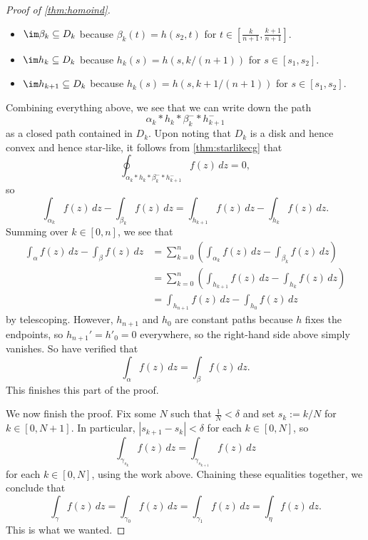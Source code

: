 \begin{proof}[Proof of \autoref{thm:homoind}]
\begin{itemize}
		\item $\im\beta_k\subseteq D_k$ because $\beta_k(t)=h(s_2,t)$ for $t\in\left[\frac k{n+1},\frac{k+1}{n+1}\right]$.
		\item $\im h_k\subseteq D_k$ because $h_k(s)=h(s,k/(n+1))$ for $s\in[s_1,s_2]$.
		\item $\im h_{k+1}\subseteq D_k$ because $h_k(s)=h(s,{k+1}/(n+1))$ for $s\in[s_1,s_2]$.
	\end{itemize}
	Combining everything above, we see that we can write down the path
	\[\alpha_k*h_k*\beta_k^-*h_{k+1}^-\]
	as a closed path contained in $D_k$. Upon noting that $D_k$ is a disk and hence convex and hence star-like, it follows from \autoref{thm:starlikecg} that
	\[\oint_{\alpha_k*h_k*\beta_k^-*h_{k+1}^-}f(z)\,dz=0,\]
	so
	\[\int_{\alpha_k}f(z)\,dz-\int_{\beta_k}f(z)\,dz=\int_{h_{k+1}}f(z)\,dz-\int_{h_k}f(z)\,dz.\]
	Summing over $k\in[0,n]$, we see that
	\begin{align*}
		\int_\alpha f(z)\,dz-\int_\beta f(z)\,dz &= \sum_{k=0}^n\left(\int_{\alpha_k}f(z)\,dz-\int_{\beta_k}f(z)\,dz\right) \\
		&= \sum_{k=0}^n\left(\int_{h_{k+1}}f(z)\,dz-\int_{h_k}f(z)\,dz\right) \\
		&= \int_{h_{n+1}}f(z)\,dz-\int_{h_0}f(z)\,dz
	\end{align*}
	by telescoping. However, $h_{n+1}$ and $h_0$ are constant paths because $h$ fixes the endpoints, so $h_{n+1}'=h'_0=0$ everywhere, so the right-hand side above simply vanishes. So have verified that
	\[\int_\alpha f(z)\,dz=\int_\beta f(z)\,dz.\]
	This finishes this part of the proof.

	We now finish the proof. Fix some $N$ such that $\frac1N<\delta$ and set $s_k:=k/N$ for $k\in[0,N+1]$. In particular, $|s_{k+1}-s_k|<\delta$ for each $k\in[0,N]$, so
	\[\int_{\gamma_{s_k}}f(z)\,dz=\int_{\gamma_{s_{k+1}}}f(z)\,dz\]
	for each $k\in[0,N]$, using the work above. Chaining these equalities together, we conclude that
	\[\int_\gamma f(z)\,dz=\int_{\gamma_0}f(z)\,dz=\int_{\gamma_1}f(z)\,dz=\int_\eta f(z)\,dz.\]
	This is what we wanted.
\end{proof}